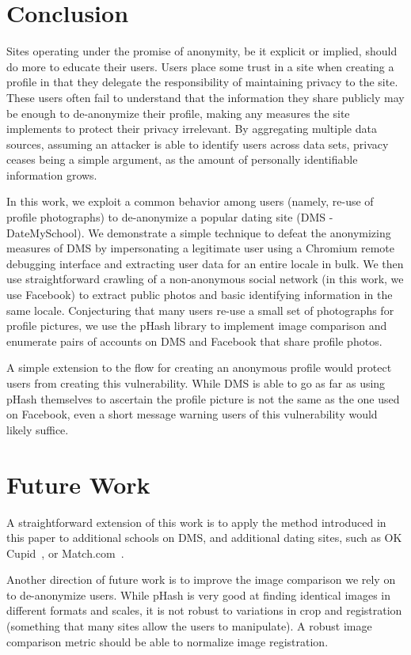 \section{Conclusion}
\label{sec:conclusion}

Sites operating under the promise of anonymity, be it explicit or implied, should do more to educate their users.
Users place some trust in a site when creating a profile in that they delegate the responsibility of maintaining privacy to the site.
These users often fail to understand that the information they share publicly may be enough to de-anonymize their profile, making any measures the site implements to protect their privacy irrelevant. By aggregating multiple data sources, assuming an attacker is able to identify users across data sets, privacy ceases being a simple argument, as the amount of personally identifiable information grows.

In this work, we exploit a common behavior among users (namely, re-use of profile photographs) to de-anonymize a popular dating site (DMS - DateMySchool).
We demonstrate a simple technique to defeat the anonymizing measures of DMS by impersonating a legitimate user using a Chromium remote debugging interface and extracting user data for an entire locale in bulk.
We then use straightforward crawling of a non-anonymous social network (in this work, we use Facebook) to extract public photos and basic identifying information in the same locale.
Conjecturing that many users re-use a small set of photographs for profile pictures, we use the pHash library to implement image comparison and enumerate pairs of accounts on DMS and Facebook that share profile photos.

A simple extension to the flow for creating an anonymous profile would protect users from creating this vulnerability. While DMS is able to go as far as using pHash themselves to ascertain the profile picture is not the same as the one used on Facebook, even a short message warning users of this vulnerability would likely suffice.

\section{Future Work}
\label{sec:related_futurework}

A straightforward extension of this work is to apply the method introduced in this paper to additional schools on DMS, and additional dating sites, such as OK Cupid~\cite{okc}, or Match.com~\cite{match}.

Another direction of future work is to improve the image comparison we rely on to de-anonymize users.
While pHash is very good at finding identical images in different formats and scales, it is not robust to variations in crop and registration (something that many sites allow the users to manipulate).
A robust image comparison metric should be able to normalize image registration. 